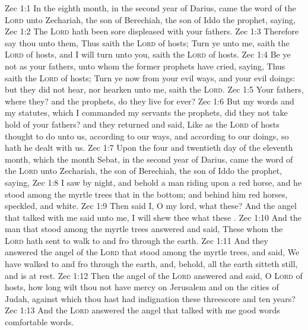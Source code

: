 \vs Zec 1:1 In the eighth month, in the second year of Darius, came the word of the \textsc{Lord} unto Zechariah, the son of Berechiah, the son of Iddo the prophet, saying,
\vs Zec 1:2 The \textsc{Lord} hath been sore displeased with your fathers.
\vs Zec 1:3 Therefore say thou unto them, Thus saith the \textsc{Lord} of hosts; Turn ye unto me, saith the \textsc{Lord} of hosts, and I will turn unto you, saith the \textsc{Lord} of hosts.
\vs Zec 1:4 Be ye not as your fathers, unto whom the former prophets have cried, saying, Thus saith the \textsc{Lord} of hosts; Turn ye now from your evil ways, and  your evil doings: but they did not hear, nor hearken unto me, saith the \textsc{Lord}.
\vs Zec 1:5 Your fathers, where  they? and the prophets, do they live for ever?
\vs Zec 1:6 But my words and my statutes, which I commanded my servants the prophets, did they not take hold of your fathers? and they returned and said, Like as the \textsc{Lord} of hosts thought to do unto us, according to our ways, and according to our doings, so hath he dealt with us.
\vs Zec 1:7 Upon the four and twentieth day of the eleventh month, which  the month Sebat, in the second year of Darius, came the word of the \textsc{Lord} unto Zechariah, the son of Berechiah, the son of Iddo the prophet, saying,
\vs Zec 1:8 I saw by night, and behold a man riding upon a red horse, and he stood among the myrtle trees that  in the bottom; and behind him  red horses, speckled, and white.
\vs Zec 1:9 Then said I, O my lord, what  these? And the angel that talked with me said unto me, I will shew thee what these .
\vs Zec 1:10 And the man that stood among the myrtle trees answered and said, These  whom the \textsc{Lord} hath sent to walk to and fro through the earth.
\vs Zec 1:11 And they answered the angel of the \textsc{Lord} that stood among the myrtle trees, and said, We have walked to and fro through the earth, and, behold, all the earth sitteth still, and is at rest.
\vs Zec 1:12 Then the angel of the \textsc{Lord} answered and said, O \textsc{Lord} of hosts, how long wilt thou not have mercy on Jerusalem and on the cities of Judah, against which thou hast had indignation these threescore and ten years?
\vs Zec 1:13 And the \textsc{Lord} answered the angel that talked with me  good words  comfortable words.
